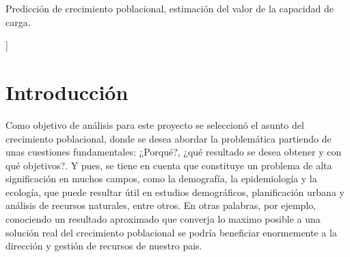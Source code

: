 \documentclass[a4paper,10pt,twocolumn]{article}
\begin{document}
\begin{topics}
	Predicción de crecimiento poblacional, estimación del valor de la capacidad de carga.
\end{topics}


\vspace{0.8cm}
]



\section{Introducción}\label{sec:intro}
Como objetivo de análisis para este proyecto se seleccionó el asunto del 
crecimiento poblacional, donde se desea abordar la problemática partiendo de 
unas cuestiones fundamentales: ¿Porqué?, ¿qué resultado se desea obtener 
y con qué objetivos?. Y pues, se tiene en cuenta que constituye un problema 
de alta significación en muchos campos, como la demografía, la epidemiología 
y la ecología, que puede resultar útil en estudios demográficos, planificación 
urbana y análisis de recursos naturales, entre otros. En otras palabras, por 
ejemplo, conociendo un resultado aproximado que converja lo maximo posible a una 
solución real del crecimiento poblacional se podría beneficiar enormemente a la 
dirección y gestión de recursos de nuestro pais.




\end{document}
